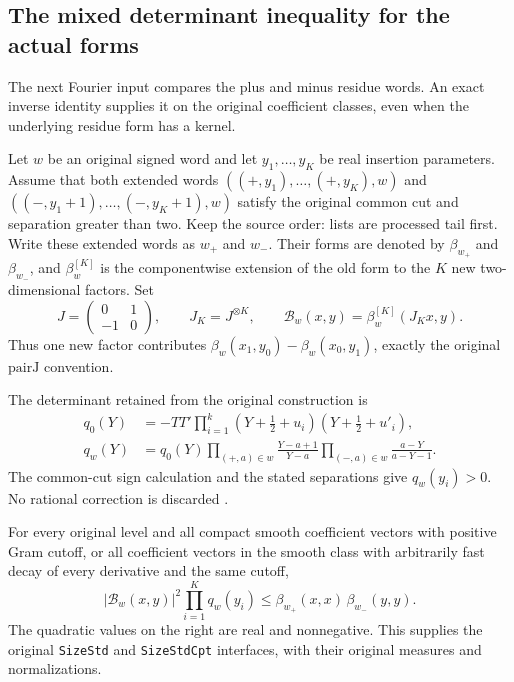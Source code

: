 \subsection{The mixed determinant inequality for the actual forms}
\label{actual-mixed-determinant-cauchy}

The next Fourier input compares the plus and minus residue words.
An exact inverse identity supplies it on the original coefficient
classes, even when the underlying residue form has a kernel.

Let $w$ be an original signed word and let $y_1,\ldots,y_K$ be
real insertion parameters.  Assume that both extended words
$((+,y_1),\ldots,(+,y_K),w)$ and
$((-,y_1+1),\ldots,(-,y_K+1),w)$ satisfy the original common
cut and separation greater than two.  Keep the source order:
lists are processed tail first.  Write these extended words as
$w_+$ and $w_-$.  Their forms are denoted by $\beta_{w_+}$ and
$\beta_{w_-}$, and $\beta_w^{[K]}$ is the componentwise extension
of the old form to the $K$ new two-dimensional factors.
Set
\[
 J=\begin{pmatrix}0&1\\-1&0\end{pmatrix},\qquad
 J_K=J^{\otimes K},\qquad
 \mathcal B_w(x,y)=\beta_w^{[K]}(J_Kx,y).
\]
Thus one new factor contributes
$\beta_w(x_1,y_0)-\beta_w(x_0,y_1)$, exactly the original
$\mathrm{pairJ}$ convention.

The determinant retained from the original construction is
\begin{equation}\label{mixed-cauchy-original-q}
 \begin{split}
 q_0(Y)&=-TT'\prod_{i=1}^k
              (Y+\tfrac12+u_i)(Y+\tfrac12+u'_i),\\
 q_w(Y)&=q_0(Y)
   \prod_{(+,a)\in w}\frac{Y-a+1}{Y-a}
   \prod_{(-,a)\in w}\frac{a-Y}{a-Y-1}.
 \end{split}
\end{equation}
The common-cut sign calculation and the stated separations give
$q_w(y_i)>0$.  No rational correction is discarded
\cite{mixed-cauchy-source,mixed-cauchy-established}.

\begin{theorem}\label{mixed-cauchy-actual}
For every original level and all compact smooth coefficient vectors
with positive Gram cutoff, or all coefficient vectors in the smooth
class with arbitrarily fast decay of every derivative and the same
cutoff,
\begin{equation}\label{mixed-cauchy-exact}
 |\mathcal B_w(x,y)|^2\prod_{i=1}^Kq_w(y_i)
           \le\beta_{w_+}(x,x)\,\beta_{w_-}(y,y).
\end{equation}
The quadratic values on the right are real and nonnegative.
This supplies the original \texttt{SizeStd} and \texttt{SizeStdCpt}
interfaces, with their original measures and normalizations.
\end{theorem}

